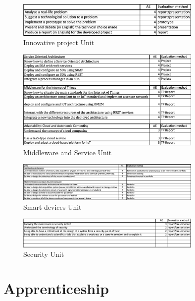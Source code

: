 \begin{figure}[!ht]
    \centering
    \includegraphics[width=0.8\textwidth]{image/Innovativ project.png}
    \caption{Innovative project Unit}
    \label{fig:Innovativ project}
\end{figure}
\begin{figure}[!ht]
    \centering
    \includegraphics[width=0.8\textwidth]{image/Middleware and Service.png}
    \caption{Middleware and Service Unit}
    \label{fig:Middleware and Service}
\end{figure}
\begin{figure}[!ht]
    \centering
    \includegraphics[width=0.8\textwidth]{image/Smart devices.png}
    \caption{Smart devices Unit}
    \label{fig:Smart devices}
\end{figure}
\newpage
\begin{figure}[!ht]
    \centering
    \includegraphics[width=0.8\textwidth]{image/Security.png}
    \caption{Security Unit}
    \label{fig:Security}
\end{figure}


\section{Apprenticeship}

